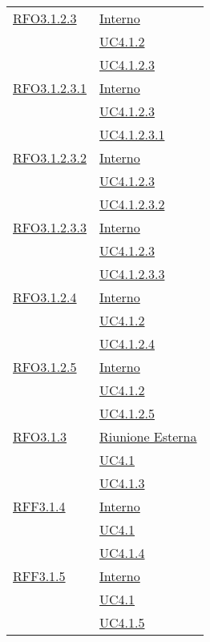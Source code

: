 \begin{longtable}{|>{\centering}m{5cm}|m{5cm}<{\centering}|}
\hyperlink{RFO3.1.2.3}{RFO3.1.2.3} &  \hyperlink{Interno}{Interno}\\ &\hyperref[UC4.1.2]{UC4.1.2}\\ &\hyperref[UC4.1.2.3]{UC4.1.2.3}\\ \hline

\hyperlink{RFO3.1.2.3.1}{RFO3.1.2.3.1} &  \hyperlink{Interno}{Interno}\\ &\hyperref[UC4.1.2.3]{UC4.1.2.3}\\ &\hyperref[UC4.1.2.3.1]{UC4.1.2.3.1}\\ \hline

\hyperlink{RFO3.1.2.3.2}{RFO3.1.2.3.2} &  \hyperlink{Interno}{Interno}\\ &\hyperref[UC4.1.2.3]{UC4.1.2.3}\\ &\hyperref[UC4.1.2.3.2]{UC4.1.2.3.2}\\ \hline

\hyperlink{RFO3.1.2.3.3}{RFO3.1.2.3.3} &  \hyperlink{Interno}{Interno}\\ &\hyperref[UC4.1.2.3]{UC4.1.2.3}\\ &\hyperref[UC4.1.2.3.3]{UC4.1.2.3.3}\\ \hline

\hyperlink{RFO3.1.2.4}{RFO3.1.2.4} &  \hyperlink{Interno}{Interno}\\ &\hyperref[UC4.1.2]{UC4.1.2}\\ &\hyperref[UC4.1.2.4]{UC4.1.2.4}\\ \hline

\hyperlink{RFO3.1.2.5}{RFO3.1.2.5} &  \hyperlink{Interno}{Interno}\\ &\hyperref[UC4.1.2]{UC4.1.2}\\ &\hyperref[UC4.1.2.5]{UC4.1.2.5}\\ \hline

\hyperlink{RFO3.1.3}{RFO3.1.3} &  \hyperlink{Riunione Esterna}{Riunione Esterna}\\ &\hyperref[UC4.1]{UC4.1}\\ &\hyperref[UC4.1.3]{UC4.1.3}\\ \hline

\hyperlink{RFF3.1.4}{RFF3.1.4} &  \hyperlink{Interno}{Interno}\\ &\hyperref[UC4.1]{UC4.1}\\ &\hyperref[UC4.1.4]{UC4.1.4}\\ \hline

\hyperlink{RFF3.1.5}{RFF3.1.5} &  \hyperlink{Interno}{Interno}\\ &\hyperref[UC4.1]{UC4.1}\\ &\hyperref[UC4.1.5]{UC4.1.5}\\ \hline


\end{longtable}
